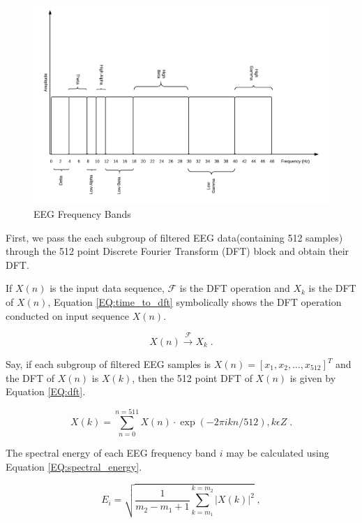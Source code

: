 	\begin{figure}[hbtp]
    	\centering
    	\includegraphics[width=1\textwidth]{Chapter-3/EEG_bands}
    	\caption{EEG Frequency Bands}
    	\label{fig:eeg_bands}
  	\end{figure}
    
	First, we pass the each subgroup of filtered EEG data(containing 512 samples) through the 512 point Discrete Fourier Transform (DFT) block and obtain their DFT.
    
    If $X(n)$ is the input data sequence, $\mathscr{F}$ is the DFT operation and $X_k$ is the DFT of $X(n)$, Equation \ref{EQ:time_to_dft} symbolically shows the DFT operation conducted on input sequence $X(n)$.
    
    \begin{equation}
    	X(n) \xrightarrow{\mathscr{F}} X_k \;.
        \label{EQ:time_to_dft}
    \end{equation}
    
    Say, if each subgroup of filtered EEG samples is $X(n) = [x_1, x_2, \ldots, x_{512}]^T$ and the DFT of $X(n)$ is $X(k)$, then the 512 point DFT of $X(n)$ is given by Equation \ref{EQ:dft}.
    
    
    \begin{equation}
    	X(k) = \sum_{n = 0}^{n = 511}{X(n) \cdot \exp{(-2 \pi i k n/512)}}, k \epsilon Z \;.
		\label{EQ:dft}
    \end{equation}
    
    The spectral energy of each EEG frequency band $i$ may be calculated using Equation \ref{EQ:spectral_energy}.
    
    \begin{equation}
    	E_i = \sqrt{\frac{1}{m_2 - m_1 + 1} \sum_{k=m_1}^{k=m_2} \left | X(k) \right | ^2} \;,
    	\label{EQ:spectral_energy}
    \end{equation}
    
